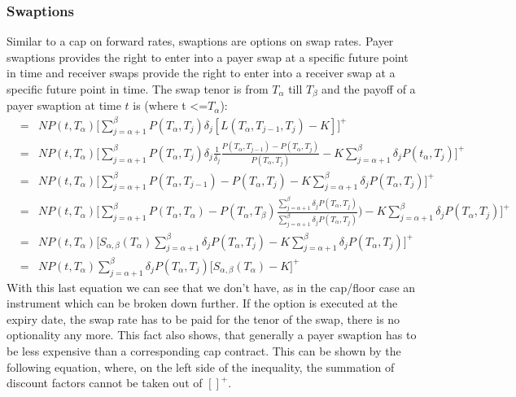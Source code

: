 \documentclass[11pt]{article}
\numberwithin{equation}{subsection}
\begin{document}
\subsubsection{Swaptions}
Similar to a cap on forward rates, swaptions are options on swap rates. Payer swaptions provides the right to enter into a payer swap at a specific future point in time and receiver swaps provide the right to enter into a receiver swap at a specific future point in time.
The swap tenor is from \(T_{\alpha}\) till \(T_{\beta}\) and the payoff of a payer swaption at time \(t\) is (where t <=\(T_{\alpha}\)):
\begin{eqnarray*}
	&=& N P(t, T_{\alpha}) \bigg[ \sum_{j=\alpha+1}^{\beta} P(T_{\alpha}, T_{j}) \delta_{j} [L(T_{\alpha}, T_{j-1}, T_{j})-K] \bigg]^{+}\\
	&=& N P(t, T_{\alpha}) \bigg[ \sum_{j=\alpha+1}^{\beta} P(T_{\alpha}, T_{j}) \delta_{j} \frac{1}{\delta_{j}} \frac{P(T_{\alpha}, T_{j-1})-P(T_{\alpha}, T_j)}{P(T_{\alpha}, T_j)} -K\sum_{j=\alpha+1}^{\beta} \delta_{j} P(t_{\alpha}, T_j) \bigg]^{+} \\	
	&=& N P(t, T_{\alpha}) \bigg[\sum_{j=\alpha+1}^{\beta} P(T_{\alpha}, T_{j-1}) - P(T_{\alpha}, T_{j}) - K\sum_{j=\alpha+1}^{\beta} \delta_{j} P(T_{\alpha}, T_j)  \bigg]^{+} \\		
	&=& N P(t, T_{\alpha}) \bigg[ \sum_{j=\alpha+1}^{\beta} P(T_{\alpha}, T_{\alpha}) - P(T_{\alpha}, T_{\beta})\frac{\sum_{j=\alpha+1}^{\beta} \delta_{j} P(T_{\alpha}, T_{j})}{\sum_{j=\alpha+1}^{\beta} \delta_{j} P(T_{\alpha}, T_{j})} ) - K \sum_{j=\alpha+1}^{\beta} \delta_{j} P(T_{\alpha}, T_j) \bigg]^{+} \\	
	&=& N P(t, T_{\alpha}) \bigg[ S_{\alpha, \beta}(T_{\alpha}) \sum_{j=\alpha+1}^{\beta} \delta_{j} P(T_{\alpha}, T_{j}) -K\sum_{j=\alpha+1}^{\beta} \delta_{j} P(T_{\alpha}, T_{j}) \bigg]^{+} \\
	&=& N P(t, T_{\alpha}) \sum_{j=\alpha+1}^{\beta} \delta_{j} P(T_{\alpha}, T_j) \big[S_{\alpha, \beta}(T_{\alpha})-K\big]^{+}
\end{eqnarray*}
With this last equation we can see that we don't have, as in the cap/floor case an instrument which can be broken down further. If the option is executed at the expiry date, the swap rate has to be paid for the tenor of the swap, there is no optionality any more. This fact also shows, that generally a payer swaption has to be less expensive than a corresponding cap contract. This can be shown by the following equation, where, on the left side of the inequality, the summation of discount factors cannot be taken out of \([]^{+}\).
\end{document}

